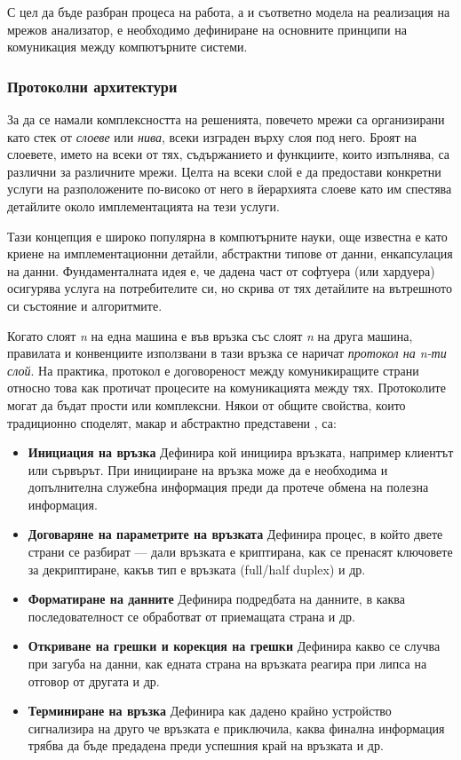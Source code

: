 \documentclass[12pt,a4paper,oneside]{book}
\begin{document}
С цел да бъде разбран процеса на работа, а и съответно модела на реализация на
мрежов анализатор, е необходимо дефиниране на основните принципи на
комуникация между компютърните системи.

\subsubsection{Протоколни архитектури}

За да се намали комплексността на решенията, повечето мрежи са организирани като
стек от \textit{слоеве} или \textit{нива}, всеки изграден върху слоя под него.
Броят на слоевете, името на всеки от тях, съдържанието и функциите,
които изпълнява, са различни за различните мрежи. Целта на всеки слой е да
предостави конкретни услуги на разположените по-високо от него в йерархията
слоеве като им спестява детайлите около имплементацията на тези услуги.

Тази концепция е широко популярна в компютърните науки, още известна е като
криене на имплементационни детайли, абстрактни типове от данни, енкапсулация на
данни. Фундаменталната идея е, че дадена част от софтуера (или хардуера)
осигурява услуга на потребителите си, но скрива от тях детайлите на вътрешното
си състояние и алгоритмите.

Когато слоят \textit{n} на една машина е във връзка със слоят \textit{n} на
друга машина, правилата и конвенциите използвани в тази връзка се наричат
\textit{протокол на n-ти слой}. На практика, протокол е договореност
между комуникиращите страни относно това как протичат процесите на
комуникацията между тях. \cite{tanenbaum_computer_2011} Протоколите могат да
бъдат прости или комплексни. Някои от общите
свойства, които традиционно споделят, макар и абстрактно представени
\cite{sanders_practical_2011}, са:

\begin{itemize}
  \item \textbf{Инициация на връзка} Дефинира кой инициира връзката, например
    клиентът или сървърът. При иницииране на връзка може да е необходима и
    допълнителна служебна информация преди да протече обмена на полезна
    информация.
  \item \textbf{Договаряне на параметрите на връзката} Дефинира процес, в който
    двете страни се разбират --- дали връзката е криптирана, как се пренасят
    ключовете за декриптиране, какъв тип е връзката (full/half duplex) и др.
  \item \textbf{Форматиране на данните} Дефинира подредбата на данните, в каква
    последователност се обработват от приемащата страна и др.
  \item \textbf{Откриване на грешки и корекция на грешки} Дефинира какво се
    случва при загуба на данни, как едната страна на връзката реагира при липса
    на отговор от другата и др.
  \item \textbf{Терминиране на връзка} Дефинира как дадено крайно устройство
    сигнализира на друго че връзката е приключила, каква финална информация
    трябва да бъде предадена преди успешния край на връзката и др.
\end{itemize}
\end{document}
